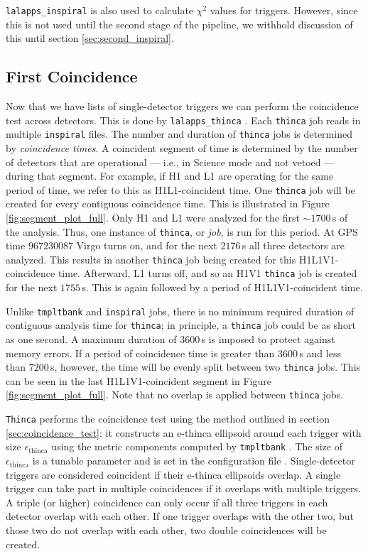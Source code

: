 \texttt{lalapps\_inspiral} is also used to calculate $\chi^2$ values for
triggers. However, since this is not used until the second stage of the
pipeline, we withhold discussion of this until section \ref{sec:second_inspiral}.

\subsection{First Coincidence}
\label{sec:first_thinca}

Now that we have lists of single-detector triggers we can perform the
coincidence test across detectors. This is done by \texttt{lalapps\_thinca}
\cite{Keppel:thesis}. Each \texttt{thinca} job reads in multiple
\texttt{inspiral} files. The number and duration of \texttt{thinca} jobs is
determined by \emph{coincidence times}. A coincident segment of time is
determined by the number of detectors that are operational --- i.e., in Science
mode and not vetoed --- during that segment. For example, if H1 and L1 are
operating for the same period of time, we refer to this as H1L1-coincident
time. One \texttt{thinca} job will be created for every contiguous coincidence
time. This is illustrated in Figure \ref{fig:segment_plot_full}. Only H1 and L1
were analyzed for the first $\sim1700\,$s of the analysis. Thus, one instance
of \texttt{thinca}, or \emph{job}, is run for this period. At GPS time
$967230087$ Virgo turns on, and for the next $2176\,$s all three detectors are
analyzed. This results in another \texttt{thinca} job being created for this
H1L1V1-coincidence time. Afterward, L1 turns off, and so an H1V1
\texttt{thinca} job is created for the next $1755\,$s. This is again followed
by a period of H1L1V1-coincident time.

Unlike \texttt{tmpltbank} and \texttt{inspiral} jobs, there is no minimum
required duration of contiguous analysis time for \texttt{thinca}; in
principle, a \texttt{thinca} job could be as short as one second. A maximum
duration of $3600\,$s is imposed to protect against memory errors. If a period
of coincidence time is greater than $3600\,$s and less than $7200\,$s, however,
the time will be evenly split between two \texttt{thinca} jobs. This can be
seen in the last H1L1V1-coincident segment in Figure
\ref{fig:segment_plot_full}. Note that no overlap is applied between
\texttt{thinca} jobs.

\texttt{Thinca} performs the coincidence test using the method outlined in
section \ref{sec:coincidence_test}: it constructs an e-thinca ellipsoid around
each trigger with size $\epsilon_{\mathrm{thinca}}$ using the metric components
computed by \texttt{tmpltbank} \cite{Robinson:2008}. The size of
$\epsilon_{\mathrm{thinca}}$ is a tunable parameter and is set in the
configuration file \cite{Keppel:thesis}. Single-detector triggers are
considered coincident if their e-thinca ellipsoids overlap. A single trigger
can take part in multiple coincidences if it overlaps with multiple triggers. A
triple (or higher) coincidence can only occur if all three triggers in each
detector overlap with each other. If one trigger overlaps with the other two,
but those two do not overlap with each other, two double coincidences will be
created.

